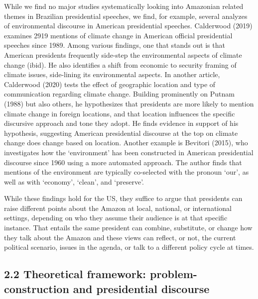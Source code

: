 \documentclass[
]{article}
\begin{document}
While we find no major studies systematically looking into Amazonian
related themes in Brazilian presidential speeches, we find, for example,
several analyzes of environmental discourse in American presidential
speeches. Calderwood (2019) examines 2919 mentions of climate change in
American official presidential speeches since 1989. Among various
findings, one that stands out is that American presidents frequently
side-step the environmental aspects of climate change (ibid). He also
identifies a shift from economic to security framing of climate issues,
side-lining its environmental aspects. In another article, Calderwood
(2020) tests the effect of geographic location and type of communication
regarding climate change. Building prominently on Putnam (1988) but also
others, he hypothesizes that presidents are more likely to mention
climate change in foreign locations, and that location influences the
specific discursive approach and tone they adopt. He finds evidence in
support of his hypothesis, suggesting American presidential discourse at
the top on climate change does change based on location. Another example
is Bevitori (2015), who investigates how the `environment' has been
constructed in American presidential discourse since 1960 using a more
automated approach. The author finds that mentions of the environment
are typically co-selected with the pronoun `our', as well as with
`economy', `clean', and `preserve'.

While these findings hold for the US, they suffice to argue that
presidents can raise different points about the Amazon at local,
national, or international settings, depending on who they assume their
audience is at that specific instance. That entails the same president
can combine, substitute, or change how they talk about the Amazon and
these views can reflect, or not, the current political scenario, issues
in the agenda, or talk to a different policy cycle at times.

\hypertarget{theoretical-framework-problem-construction-and-presidential-discourse}{%
\subsection{2.2 Theoretical framework: problem-construction and
presidential
discourse}\label{theoretical-framework-problem-construction-and-presidential-discourse}}
\end{document}
